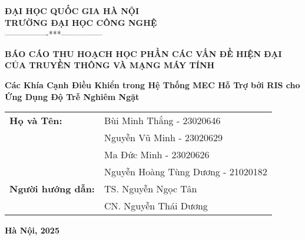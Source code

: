 
\begin{titlepage}
    \begin{center}
        \large\textbf{ĐẠI HỌC QUỐC GIA HÀ NỘI}\\
        \large\textbf{TRƯỜNG ĐẠI HỌC CÔNG NGHỆ}\\
        ----------------***---------------

        \vspace{3cm}
        {\large\textbf{BÁO CÁO THU HOẠCH HỌC PHẦN CÁC VẤN ĐỀ HIỆN ĐẠI CỦA TRUYỀN THÔNG VÀ MẠNG MÁY TÍNH}}

        \vspace{3cm}
        {\huge\textbf{Các Khía Cạnh Điều Khiển trong Hệ Thống MEC Hỗ Trợ bởi RIS cho Ứng Dụng Độ Trễ Nghiêm Ngặt}}

        \vfill
        \begin{table}[h]
            \centering
            \large
            \begin{tabular}{ll}
                \textbf{Họ và Tên:} & Bùi Minh Thắng - 23020646 \\
                \textbf{          } & Nguyễn Vũ Minh - 23020629 \\
                \textbf{          } & Ma Đức Minh - 23020626 \\
                \textbf{          } & Nguyễn Hoàng Tùng Dương - 21020182 \\
                \textbf{Người hướng dẫn:} & TS. Nguyễn Ngọc Tân \\
                \textbf{                } & CN. Nguyễn Thái Dương \\
            \end{tabular}
        \end{table}

        \vspace{4cm}
        \textbf{Hà Nội, 2025}
        
    \end{center}
\end{titlepage}
